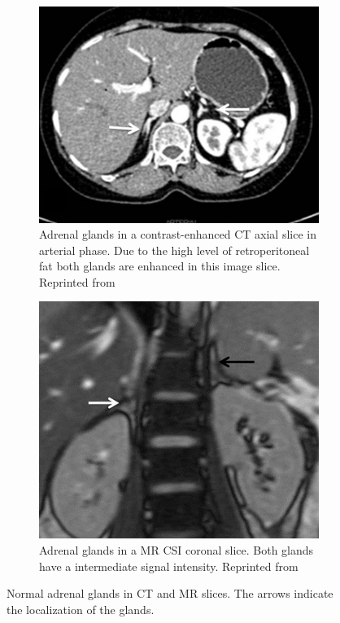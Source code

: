 \documentclass{article}
\begin{document}
\begin{figure}
    \centering
    \begin{subfigure}[b]{0.45\textwidth}
        \centering
        \includegraphics[width=\textwidth]{figures/CT_adrenal_enhanced.png}
        \caption{Adrenal glands in a contrast-enhanced CT axial slice in arterial phase. Due to the high level of retroperitoneal fat both glands are enhanced in this image slice. Reprinted from \cite{Panda2015}}
        \label{fig:adrenal_ct}
    \end{subfigure}
    \hfill
    \begin{subfigure}[b]{0.45\textwidth}
        \centering
        \includegraphics[width=\textwidth]{figures/MRI_adrenal.png}
        \caption{Adrenal glands in a MR CSI coronal slice. Both glands have a intermediate signal intensity. Reprinted from \cite{Panda2015} }
        \label{fig:adrenal_mri}
    \end{subfigure}
    \caption{Normal adrenal glands in CT and MR slices. The arrows indicate the localization of the glands.}
    \label{fig:adrenal_glands_normal}
\end{figure}
\end{document}
